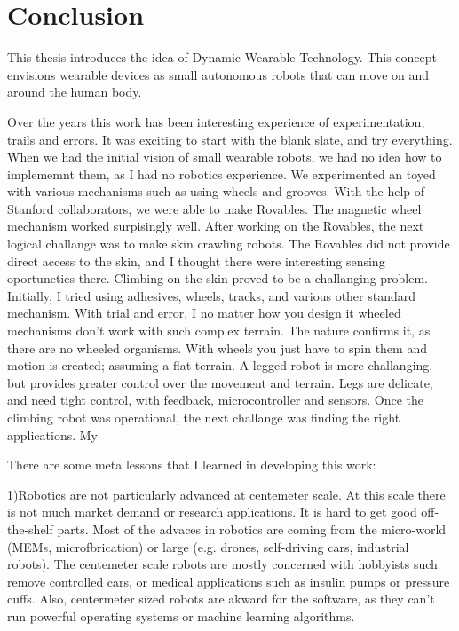 \chapter{Conclusion}

This thesis introduces the idea of Dynamic Wearable Technology. This concept envisions wearable devices as small autonomous robots that can move on and around the human body.

Over the years this work has been interesting experience of experimentation, trails and errors. It was exciting to start with the blank slate, and try everything. When we had the initial vision of small wearable robots, we had no idea how to implememnt them, as I had no robotics experience. We experimented an toyed with various mechanisms such as using wheels and grooves. With the help of Stanford collaborators, we were able to make Rovables. The magnetic wheel mechanism worked surpisingly well. After working on the Rovables, the next logical challange was to make skin crawling robots. The Rovables did not provide direct access to the skin, and I thought there were interesting sensing oportuneties there. Climbing on the skin proved to be a challanging problem. Initially, I tried using adhesives, wheels, tracks, and various other standard mechanism. With trial and error, I no matter how you design it wheeled mechanisms don't work with such complex terrain. The nature confirms it, as there are no wheeled organisms. With wheels you just have to spin them and motion is created; assuming a flat terrain. A legged robot is more challanging, but provides greater control over the movement and terrain. Legs are delicate, and need tight control, with feedback, microcontroller and sensors. Once the climbing robot was operational, the next challange was finding the right applications. My 

There are some meta lessons that I learned in developing this work: 

1)Robotics are not particularly advanced at centemeter scale. At this scale there is not much market demand or research applications. It is hard to get good off-the-shelf parts. Most of the advaces in robotics are coming 
from the micro-world (MEMs, microfbrication) or large (e.g. drones, self-driving cars, industrial robots). The centemeter scale robots are mostly concerned with hobbyists such remove controlled cars, or medical applications such as insulin pumps or pressure cuffs.  Also, centermeter sized robots are akward for the software, as they can't run powerful operating systems or machine learning algorithms. 

